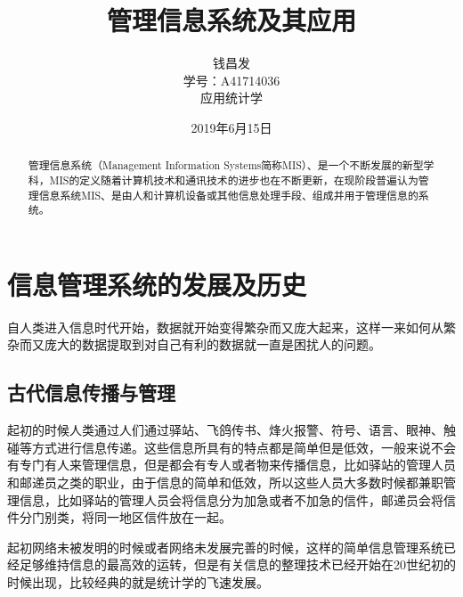 \documentclass[a4paper,UTF8,cs4size]{ctexart}
\title{\heiti\zihao{2}\bfseries 管理信息系统及其应用}
\author{\zihao{3}\kaishu 钱昌发\\\zihao{3}\kaishu 学号：A41714036\\\zihao{3}\kaishu 应用统计学}
\date{\songti 2019年6月15日}
\begin{document}
	\maketitle
	\newpage
	\tableofcontents
	\newpage
	\begin{abstract}
		管理信息系统（Management Information Systems简称MIS）、是一个不断发展的新型学科，MIS的定义随着计算机技术和通讯技术的进步也在不断更新，在现阶段普遍认为管理信息系统MIS、是由人和计算机设备或其他信息处理手段、组成并用于管理信息的系统。\cite{q4}
	\end{abstract}
	\section{信息管理系统的发展及历史}
	自人类进入信息时代开始，数据就开始变得繁杂而又庞大起来，这样一来如何从繁杂而又庞大的数据提取到对自己有利的数据就一直是困扰人的问题。\par
	\subsection{古代信息传播与管理}
	起初的时候人类通过人们通过驿站、飞鸽传书、烽火报警、符号、语言、眼神、触碰等方式进行信息传递。这些信息所具有的特点都是简单但是低效，一般来说不会有专门有人来管理信息，但是都会有专人或者物来传播信息，比如驿站的管理人员和邮递员之类的职业，由于信息的简单和低效，所以这些人员大多数时候都兼职管理信息，比如驿站的管理人员会将信息分为加急或者不加急的信件，邮递员会将信件分门别类，将同一地区信件放在一起。\par
	起初网络未被发明的时候或者网络未发展完善的时候，这样的简单信息管理系统已经足够维持信息的最高效的运转，但是有关信息的整理技术已经开始在20世纪初的时候出现，比较经典的就是统计学的飞速发展。\par
\end{document}
